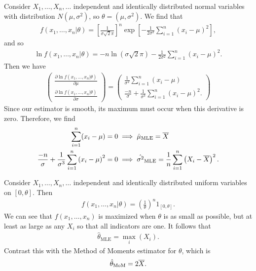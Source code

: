\begin{exmp}
    Consider $X_1, \ldots, X_n, \ldots$ independent and identically distributed normal variables with distribution $N(\mu, \sigma^2)$, so $\theta = (\mu, \sigma^2)$. We find that
    \begin{align*}
        f\left(x_1, \ldots, x_n|\theta\right) = \left[\frac{1}{\sigma\sqrt{2}\pi}\right]^{n}\exp\left[-\frac{1}{2\sigma^2}\sum_{i=1}^{n}\left(x_i-\mu\right)^2\right],
    \end{align*}
    and so
    \begin{align*}
        \ln f\left(x_1, \ldots, x_n|\theta\right) = -n\ln(\sigma\sqrt{2}\pi) -\frac{1}{2\sigma^2}\sum_{i=1}^{n}\left(x_i-\mu\right)^2.
    \end{align*}
    Then we have
    \begin{align*}
        \begin{pmatrix}
            \frac{\partial \ln f\left(x_1, \ldots, x_n|\theta\right)}{\partial \mu} \\
            \frac{\partial \ln f\left(x_1, \ldots, x_n|\theta\right)}{\partial \sigma}
        \end{pmatrix} = \begin{pmatrix}
            \frac{1}{\sigma^2}\sum_{i=1}^{n}\left(x_i-\mu\right) \\
            \frac{-n}{\sigma} + \frac{1}{\sigma^3}\sum_{i=1}^{n}\left(x_i-\mu\right)^2.
        \end{pmatrix}
    \end{align*}
    Since our estimator is smooth, its maximum must occur when this derivative is zero. Therefore, we find
    \begin{align*}
        \sum_{i=1}^{n}(x_i - \mu) &= 0 \implies \hat{\mu}_{\textrm{MLE}} = \overline{X} \\
        \frac{-n}{\sigma} + \frac{1}{\sigma^3}\sum_{i=1}^{n}\left(x_i-\mu\right)^2 &= 0 \implies \hat{\sigma^2}_{\textrm{MLE}} = \frac{1}{n}\sum_{i=1}^{n}\left(X_i-\overline{X}\right)^2.
    \end{align*}
\end{exmp}

\begin{exmp}
    Consider $X_1, \ldots, X_n, \ldots$ independent and identically distributed uniform variables on $[0, \theta]$. Then
    \begin{align*}
        f(x_1, \ldots, x_n|\theta) = \left(\frac{1}{\theta}\right)^{n}1_{[0, \theta]}.
    \end{align*}
    We can see that $f(x_1, \ldots, x_n)$ is maximized when $\theta$ is as small as possible, but at least as large as any $X_i$ so that all indicators are one. It follows that
    \begin{align*}
        \hat{\theta}_{\textrm{MLE}} = \max_{i}(X_i).
    \end{align*}
    Contrast this with the Method of Moments estimator for $\theta$, which is
    \begin{align*}
        \hat{\theta}_{\textrm{MoM}} = 2\overline{X}.
    \end{align*}
\end{exmp}

